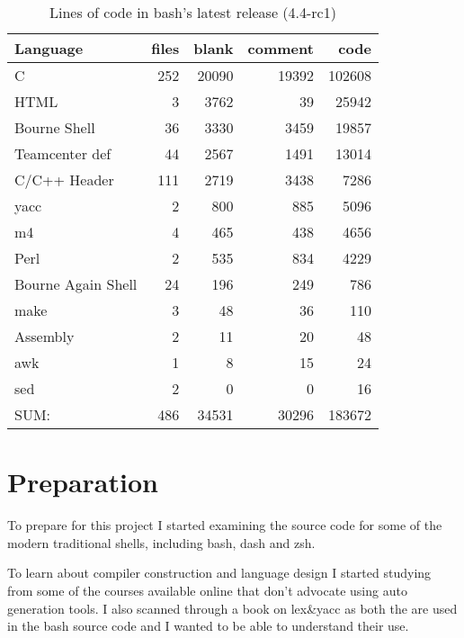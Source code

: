 \begin{table}[hp]
\centering
\caption{Lines of code in bash's latest release (4.4-rc1)}
\label{tab:bash-loc}
\begin{tabular}{@{}lrrrr@{}}
\toprule
Language           & files & blank & comment & code   \\ \midrule
C                  & 252   & 20090 & 19392   & 102608 \\
HTML               & 3     & 3762  & 39      & 25942  \\
Bourne Shell       & 36    & 3330  & 3459    & 19857  \\
Teamcenter def     & 44    & 2567  & 1491    & 13014  \\
C/C++ Header       & 111   & 2719  & 3438    & 7286   \\
yacc               & 2     & 800   & 885     & 5096   \\
m4                 & 4     & 465   & 438     & 4656   \\
Perl               & 2     & 535   & 834     & 4229   \\
Bourne Again Shell & 24    & 196   & 249     & 786    \\
make               & 3     & 48    & 36      & 110    \\
Assembly           & 2     & 11    & 20      & 48     \\
awk                & 1     & 8     & 15      & 24     \\
sed                & 2     & 0     & 0       & 16     \\ \midrule
SUM:               & 486   & 34531 & 30296   & 183672 \\ \bottomrule
\end{tabular}
\end{table}



\section{Preparation}

To prepare for this project I started examining the source code for some of the modern traditional shells, including bash, dash and zsh.

To learn about compiler construction and language design I started studying from some of the courses available online that don't advocate using auto generation tools\cite{COMPILERS-COURSE,CRENSHAW}.
I also scanned through a book on lex\&yacc as both the are used in the bash source code and I wanted to be able to understand their use.

